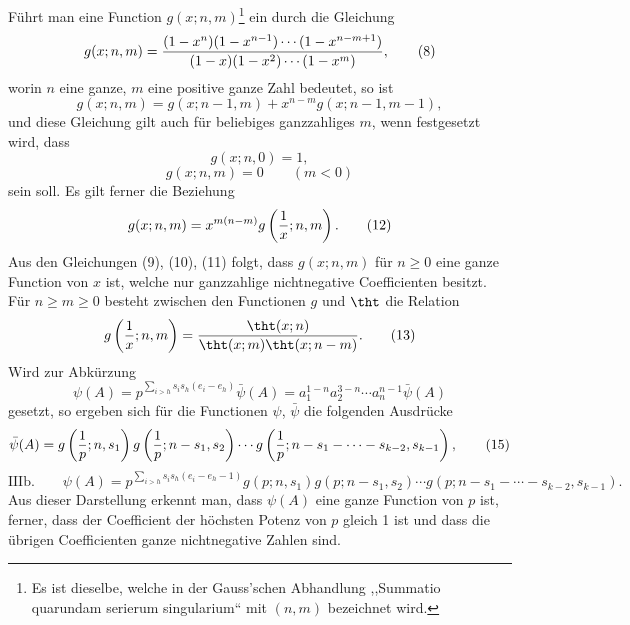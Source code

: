 Führt man eine Function $g(x;n,m)$\footnote{Es ist dieselbe, welche in der Gauss'schen Abhandlung ,,Summatio quarundam serierum singularium`` mit $(n,m)$ bezeichnet wird.} ein durch die Gleichung
\begin{equation}
 g(x;n,m)=
 { (1-x^n)(1-x^{n-1})\cdots(1-x^{n-m+1})
 \over
 (1-x)(1-x^2)\cdots(1-x^m) },
\tag{8}
\end{equation}
worin $n$ eine ganze, $m$ eine positive ganze Zahl bedeutet, so ist
\begin{equation}
 g(x;n,m)=g(x;n-1,m)+x^{n-m}g(x;n-1,m-1),
\tag{9}
\end{equation}
und diese Gleichung gilt auch für beliebiges ganzzahliges $m$, wenn festgesetzt wird, dass
\begin{equation}
 g(x;n,0)=1,
\tag{10}
\end{equation}
\begin{equation}
 g(x;n,m)=0\qquad (m<0)
\tag{11}
\end{equation}
sein soll. Es gilt ferner die Beziehung
\begin{equation}
 g(x;n,m)=x^{m(n-m)}g\left({1\over x};n,m\right).
\tag{12}
\end{equation}
Aus den Gleichungen (9), (10), (11) folgt, dass $g(x;n,m)$ für $n\ge0$ eine ganze Function von $x$ ist, welche nur ganzzahlige nichtnegative Coefficienten besitzt. Für $n\ge m\ge0$ besteht zwischen den Functionen $g$ und $\tht$ die Relation
\begin{equation}
 g\left({1\over x};n,m\right)={\tht(x;n)\over\tht(x;m)\tht(x;n-m)}.
\tag{13}
\end{equation}
Wird zur Abkürzung
\begin{equation}
 \psi(A)=p^{\sum_{i>h}s_i s_h(e_i-e_h)}\bar\psi(A)
 =a_1^{1-n}a_2^{3-n}\cdots a_n^{n-1}\bar\psi(A)
\tag{14}
\end{equation}
gesetzt, so ergeben sich für die Functionen $\psi$, $\bar\psi$ die folgenden Ausdrücke
\begin{equation}
 \bar\psi(A)=
 g\left({1\over p};n,s_1\right)
 g\left({1\over p};n-s_1,s_2\right)
 \cdots
 g\left({1\over p};n-s_1-\cdots-s_{k-2},s_{k-1}\right),
\tag{15}
\end{equation}
\begin{equation}
\text{IIIb.}\qquad
 \psi(A)=p^{\sum_{i>h}s_i s_h(e_i-e_h-1)}
 g(p;n,s_1)g(p;n-s_1,s_2)\cdots
 g(p;n-s_1-\cdots-s_{k-2},s_{k-1}).
\tag{16}
\end{equation}
Aus dieser Darstellung erkennt man, dass $\psi(A)$ eine ganze Function von $p$ ist, ferner, dass der Coefficient der höchsten Potenz von $p$ gleich 1 ist und dass die übrigen Coefficienten ganze nichtnegative Zahlen sind.

